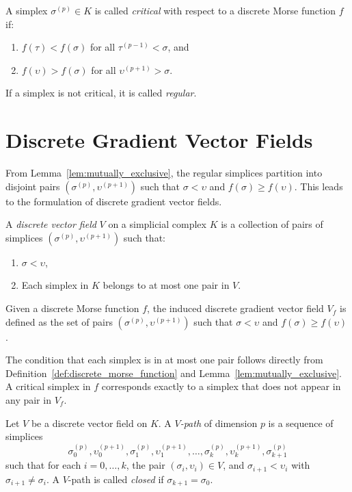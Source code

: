 \begin{definition}
A simplex $\sigma^{(p)} \in K$ is called \emph{critical} with respect to a discrete Morse function $f$ if:
\begin{enumerate}
    \item $f(\tau) < f(\sigma)$ for all $\tau^{(p-1)} < \sigma$, and
    \item $f(\upsilon) > f(\sigma)$ for all $\upsilon^{(p+1)} > \sigma$.
\end{enumerate}
If a simplex is not critical, it is called \emph{regular}.
\end{definition}

\section{Discrete Gradient Vector Fields}

From Lemma~\ref{lem:mutually_exclusive}, the regular simplices partition into disjoint pairs $(\sigma^{(p)}, \upsilon^{(p+1)})$ such that $\sigma < \upsilon$ and $f(\sigma) \ge f(\upsilon)$. This leads to the formulation of discrete gradient vector fields.

\begin{definition}
A \emph{discrete vector field} $V$ on a simplicial complex $K$ is a collection of pairs of simplices $(\sigma^{(p)}, \upsilon^{(p+1)})$ such that:
\begin{enumerate}
    \item $\sigma < \upsilon$,
    \item Each simplex in $K$ belongs to at most one pair in $V$.
\end{enumerate}
\end{definition}

\begin{definition}
Given a discrete Morse function $f$, the induced discrete gradient vector field $V_f$ is defined as the set of pairs $(\sigma^{(p)}, \upsilon^{(p+1)})$ such that $\sigma < \upsilon$ and $f(\sigma) \ge f(\upsilon)$. 
\end{definition}

The condition that each simplex is in at most one pair follows directly from Definition~\ref{def:discrete_morse_function} and Lemma~\ref{lem:mutually_exclusive}. A critical simplex in $f$ corresponds exactly to a simplex that does not appear in any pair in $V_f$.

\begin{definition}[$V$-paths]
Let $V$ be a discrete vector field on $K$. A \emph{$V$-path} of dimension $p$ is a sequence of simplices
\[ \sigma_0^{(p)}, \upsilon_0^{(p+1)}, \sigma_1^{(p)}, \upsilon_1^{(p+1)}, \dots, \sigma_k^{(p)}, \upsilon_k^{(p+1)}, \sigma_{k+1}^{(p)} \]
such that for each $i = 0, \dots, k$, the pair $(\sigma_i, \upsilon_i) \in V$, and $\sigma_{i+1} < \upsilon_i$ with $\sigma_{i+1} \neq \sigma_i$.
A $V$-path is called \emph{closed} if $\sigma_{k+1} = \sigma_0$.
\end{definition}

